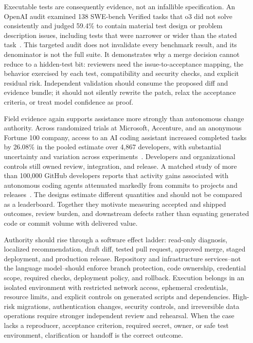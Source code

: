 Executable tests are consequently evidence, not an infallible specification. An OpenAI audit examined 138 SWE-bench Verified tasks that o3 did not solve consistently and judged 59.4\% to contain material test design or problem description issues, including tests that were narrower or wider than the stated task~\cite{openai2026swebenchaudit}. This targeted audit does not invalidate every benchmark result, and its denominator is not the full suite. It demonstrates why a merge decision cannot reduce to a hidden-test bit: reviewers need the issue-to-acceptance mapping, the behavior exercised by each test, compatibility and security checks, and explicit residual risk. Independent validation should consume the proposed diff and evidence bundle; it should not silently rewrite the patch, relax the acceptance criteria, or treat model confidence as proof.

Field evidence again supports assistance more strongly than autonomous change authority. Across randomized trials at Microsoft, Accenture, and an anonymous Fortune 100 company, access to an AI coding assistant increased completed tasks by 26.08\% in the pooled estimate over 4,867 developers, with substantial uncertainty and variation across experiments~\cite{cui2026highskilledwork}. Developers and organizational controls still owned review, integration, and release. A matched study of more than 100,000 GitHub developers reports that activity gains associated with autonomous coding agents attenuated markedly from commits to projects and releases~\cite{demirer2026writingcode}. The designs estimate different quantities and should not be compared as a leaderboard. Together they motivate measuring accepted and shipped outcomes, review burden, and downstream defects rather than equating generated code or commit volume with delivered value.

Authority should rise through a software effect ladder: read-only diagnosis, localized recommendation, draft diff, tested pull request, approved merge, staged deployment, and production release. Repository and infrastructure services--not the language model--should enforce branch protection, code ownership, credential scope, required checks, deployment policy, and rollback. Execution belongs in an isolated environment with restricted network access, ephemeral credentials, resource limits, and explicit controls on generated scripts and dependencies. High-risk migrations, authentication changes, security controls, and irreversible data operations require stronger independent review and rehearsal. When the case lacks a reproducer, acceptance criterion, required secret, owner, or safe test environment, clarification or handoff is the correct outcome.

